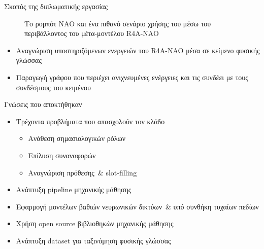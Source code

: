 \documentclass{beamer}
\def\textenglish{}
\newcommand{\en}[1]{\textenglish{#1}}
\newcommand{\metamodel}{\en{R4A-NAO}}
\begin{document}
\begin{frame}{Σκοπός της διπλωματικής εργασίας}
\begin{figure}
        \caption{Το ρομπότ NAO και ένα πιθανό σενάριο χρήσης του μέσω του περιβάλλοντος του μέτα-μοντέλου \metamodel{}}
    \end{figure}
    \begin{itemize}
        \item Αναγνώριση υποστηριζόμενων ενεργειών του \metamodel{} μέσα σε κείμενο φυσικής γλώσσας
        \item Παραγωγή γράφου που περιέχει ανιχνευμένες ενέργειες και τις συνδέει με τους συνδέσμους του κειμένου
    \end{itemize}
\end{frame}

\begin{frame}{Γνώσεις που αποκτήθηκαν}
    \begin{itemize}
        \item Τρέχοντα προβλήματα που απασχολούν τον κλάδο
              \begin{itemize}
                  \item Ανάθεση σημασιολογικών ρόλων
                  \item Επίλυση συναναφορών
                  \item Αναγνώριση πρόθεσης~\& \en{slot-filling}
              \end{itemize}
        \item Ανάπτυξη \en{pipeline} μηχανικής μάθησης
        \item Εφαρμογή μοντέλων βαθιών νευρωνικών δικτύων~\& υπό συνθήκη τυχαίων πεδίων
        \item Χρήση open source βιβλιοθηκών μηχανικής μάθησης
        \item Ανάπτυξη dataset για ταξινόμηση φυσικής γλώσσας
    \end{itemize}
\end{frame}
\end{document}
